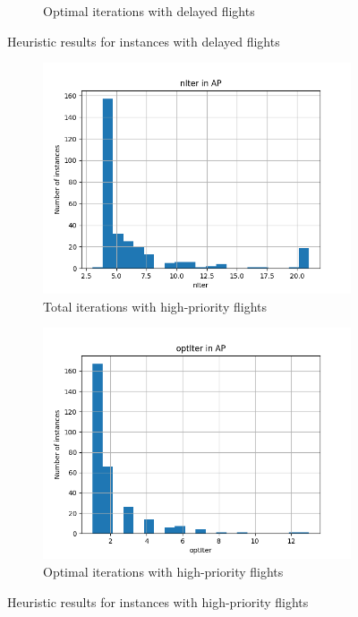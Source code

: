 \documentclass[../../thesis.tex]{subfiles}
\begin{document}
\begin{figure}[ht]
\begin{subfigure}{0.49\textwidth}
        \caption{Optimal iterations with delayed flights}
        \label{fig:heurDD:optIter}
    \end{subfigure}
    \caption{Heuristic results for instances with delayed flights}
    \label{fig:heur:delay}
\end{figure}
\begin{figure}
\centering
    \begin{subfigure}{0.49\textwidth}
        \centering
        \includegraphics[width=\linewidth]{thesis/picture/heuristic/nIter_histogram_AP.png}
        \caption{Total iterations with high-priority flights}
        \label{fig:heurAP:nIter}
    \end{subfigure}
    \hfill
    \begin{subfigure}{0.49\textwidth}
        \centering
        \includegraphics[width=\linewidth]{thesis/picture/heuristic/optIter_histogram_AP.png}
        \caption{Optimal iterations with high-priority flights}
        \label{fig:heurAP:optIter}
    \end{subfigure}
    \caption{Heuristic results for instances with high-priority flights}
    \label{fig:heur:AP}
\end{figure}
\end{document}
